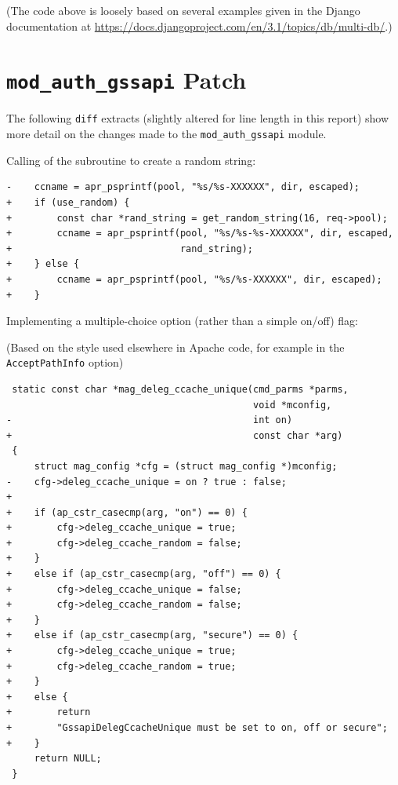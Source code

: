 \documentclass[12pt]{report}
\begin{document}
(The code above is loosely based on several examples given in the Django documentation at \url{https://docs.djangoproject.com/en/3.1/topics/db/multi-db/}.)

\chapter{\texttt{mod\_auth\_gssapi} Patch}
\label{sec:appendix3}

The following \texttt{diff} extracts (slightly altered for line length in this report) show more detail on the changes made to the \verb+mod_auth_gssapi+ module.

Calling of the subroutine to create a random string:

\begin{verbatim}
-    ccname = apr_psprintf(pool, "%s/%s-XXXXXX", dir, escaped);
+    if (use_random) {
+        const char *rand_string = get_random_string(16, req->pool);
+        ccname = apr_psprintf(pool, "%s/%s-%s-XXXXXX", dir, escaped,
+                              rand_string);
+    } else {
+        ccname = apr_psprintf(pool, "%s/%s-XXXXXX", dir, escaped);
+    }
\end{verbatim}

Implementing a multiple-choice option (rather than a simple on/off) flag:

(Based on the style used elsewhere in Apache code, for example in the \texttt{AcceptPathInfo} option\cite{AcceptPathInfo-source})

\begin{verbatim}
 static const char *mag_deleg_ccache_unique(cmd_parms *parms,
                                            void *mconfig,
-                                           int on)
+                                           const char *arg)
 {
     struct mag_config *cfg = (struct mag_config *)mconfig;
-    cfg->deleg_ccache_unique = on ? true : false;
+
+    if (ap_cstr_casecmp(arg, "on") == 0) {
+        cfg->deleg_ccache_unique = true;
+        cfg->deleg_ccache_random = false;
+    }
+    else if (ap_cstr_casecmp(arg, "off") == 0) {
+        cfg->deleg_ccache_unique = false;
+        cfg->deleg_ccache_random = false;
+    }
+    else if (ap_cstr_casecmp(arg, "secure") == 0) {
+        cfg->deleg_ccache_unique = true;
+        cfg->deleg_ccache_random = true;
+    }
+    else {
+        return
+        "GssapiDelegCcacheUnique must be set to on, off or secure";
+    }
     return NULL;
 }
\end{verbatim}
\end{document}
